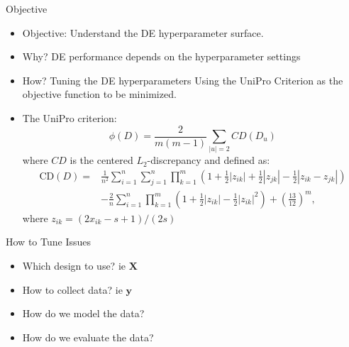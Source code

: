 \documentclass{beamer}
\newcommand{\X}{\boldsymbol{X}}
\newcommand{\y}{\boldsymbol{y}}
\begin{document}
\begin{frame}{Objective}
 \begin{itemize}
     \item Objective: Understand the DE hyperparameter surface.
     \item Why? DE performance depends on the hyperparameter settings
     \item How? Tuning the DE hyperparameters Using the UniPro Criterion as the objective function to be minimized.
     \item The UniPro criterion:
     $$
      \phi(D) = \frac{2}{m(m-1)}\sum_{|u| = 2}CD(D_u)
     $$
     where $CD$ is the centered $L_2$-discrepancy and defined as:
     $$
     \begin{aligned}
 \mathrm{CD}(D)= & \frac{1}{n^2} \sum_{i=1}^n \sum_{j=1}^n \prod_{k=1}^m\left(1+\frac{1}{2}\left|z_{i k}\right|+\frac{1}{2}\left|z_{j k}\right|-\frac{1}{2}\left|z_{i k}-z_{j k}\right|\right) \\
 & -\frac{2}{n} \sum_{i=1}^n \prod_{k=1}^m\left(1+\frac{1}{2}\left|z_{i k}\right|-\frac{1}{2}\left|z_{i k}\right|^2\right)+\left(\frac{13}{12}\right)^m,
 \end{aligned}
 $$
 where $z_{ik} = (2x_{ik} - s+1)/(2s)$\\
\end{itemize}
\end{frame}


\begin{frame}{How to Tune}
Issues
\begin{itemize}
  \item Which design to use? ie $\X$
  \item How to collect data? ie $\y$
  \item How do we model the data?
  \item How do we evaluate the data?
\end{itemize}

\end{frame}
\end{document}
